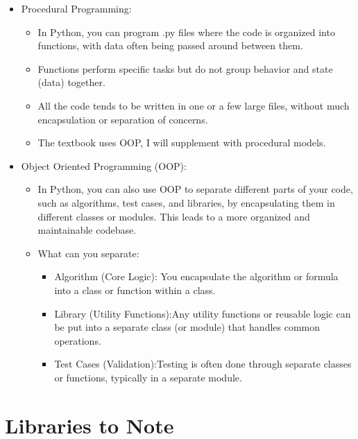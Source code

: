 \documentclass[
  letterpaper,
  DIV=11,
  numbers=noendperiod]{scrreprt}
\providecommand{\tightlist}{%
  \setlength{\itemsep}{0pt}\setlength{\parskip}{0pt}}\usepackage{longtable,booktabs,array}
\begin{document}
\begin{itemize}
\tightlist
\item
  Procedural Programming:

  \begin{itemize}
  \tightlist
  \item
    In Python, you can program .py files where the code is organized
    into functions, with data often being passed around between them.
  \item
    Functions perform specific tasks but do not group behavior and state
    (data) together.
  \item
    All the code tends to be written in one or a few large files,
    without much encapsulation or separation of concerns.
  \item
    The textbook uses OOP, I will supplement with procedural models.
  \end{itemize}
\item
  Object Oriented Programming (OOP):

  \begin{itemize}
  \tightlist
  \item
    In Python, you can also use OOP to separate different parts of your
    code, such as algorithms, test cases, and libraries, by
    encapsulating them in different classes or modules. This leads to a
    more organized and maintainable codebase.
  \item
    What can you separate:

    \begin{itemize}
    \tightlist
    \item
      Algorithm (Core Logic): You encapsulate the algorithm or formula
      into a class or function within a class.
    \item
      Library (Utility Functions):Any utility functions or reusable
      logic can be put into a separate class (or module) that handles
      common operations.
    \item
      Test Cases (Validation):Testing is often done through separate
      classes or functions, typically in a separate module.
    \end{itemize}
  \end{itemize}
\end{itemize}


\chapter{Libraries to Note}\label{libraries-to-note}
\end{document}
